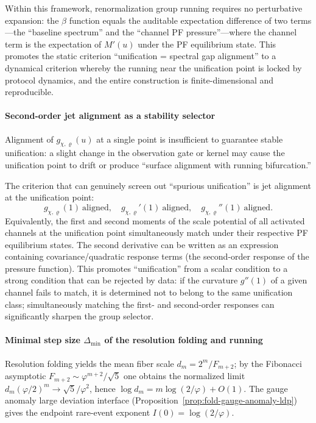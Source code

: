 \begin{proposition}\label{prop:beta-pf-expectation}
Within this framework, renormalization group running requires no perturbative expansion: the \(\beta\) function equals the auditable expectation difference of two terms---the ``baseline spectrum'' and the ``channel PF pressure''---where the channel term is the expectation of \(M'(u)\) under the PF equilibrium state. This promotes the static criterion ``unification = spectral gap alignment'' to a dynamical criterion whereby the running near the unification point is locked by protocol dynamics, and the entire construction is finite-dimensional and reproducible.
\end{proposition}

\paragraph{Second-order jet alignment as a stability selector}
Alignment of \(g_{\chi,\varrho}(u)\) at a single point is insufficient to guarantee stable unification: a slight change in the observation gate or kernel may cause the unification point to drift or produce ``surface alignment with running bifurcation.''

\begin{proposition}\label{prop:jet-alignment-unification}
The criterion that can genuinely screen out ``spurious unification'' is jet alignment at the unification point:
\[
g_{\chi,\varrho}(1)\ \text{aligned},\quad
g_{\chi,\varrho}'(1)\ \text{aligned},\quad
g_{\chi,\varrho}''(1)\ \text{aligned}.
\]
Equivalently, the first and second moments of the scale potential of all activated channels at the unification point simultaneously match under their respective PF equilibrium states. The second derivative can be written as an expression containing covariance/quadratic response terms (the second-order response of the pressure function). This promotes ``unification'' from a scalar condition to a strong condition that can be rejected by data: if the curvature \(g''(1)\) of a given channel fails to match, it is determined not to belong to the same unification class; simultaneously matching the first- and second-order responses can significantly sharpen the group selector.
\end{proposition}

\paragraph{Minimal step size \(\Delta_{\min}\) of the resolution folding and running}
Resolution folding yields the mean fiber scale \(d_m=2^m/F_{m+2}\); by the Fibonacci asymptotic \(F_{m+2}\sim \varphi^{m+2}/\sqrt5\) one obtains the normalized limit \(d_m(\varphi/2)^m\to\sqrt5/\varphi^2\), hence
\(
\log d_m=m\log(2/\varphi)+O(1).
\)
The gauge anomaly large deviation interface (Proposition~\ref{prop:fold-gauge-anomaly-ldp}) gives the endpoint rare-event exponent \(I(0)=\log(2/\varphi)\).

